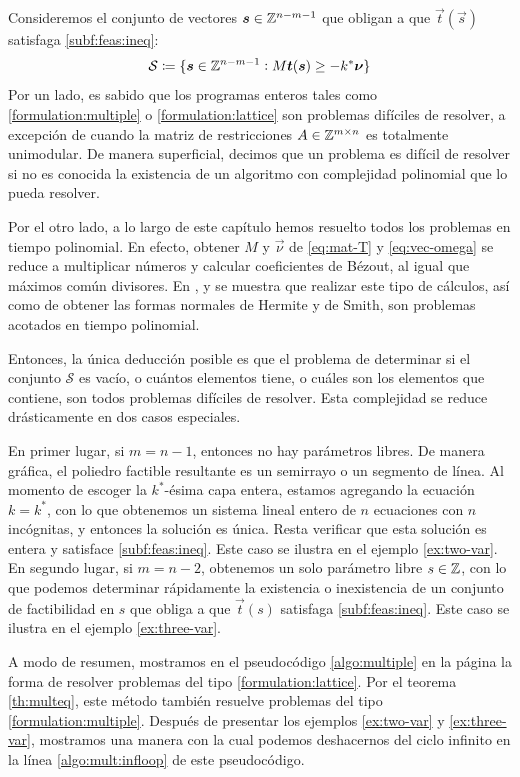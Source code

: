 Consideremos el conjunto de vectores $\boldsymbol{s} \in \mathbb{Z}^{n-m-1}$ que obligan a que $\vec{t}(\vec{s})$
satisfaga \eqref{subf:feas:ineq}:
\begin{equation*}
	\mathcal{S} \coloneq \lbrace \boldsymbol{s} \in \mathbb{Z}^{n-m-1} \vcentcolon M\boldsymbol{t}(\boldsymbol{s}) \geq -k^*\boldsymbol{\nu} \rbrace
\end{equation*}
Por un lado, es sabido que los programas enteros tales como \eqref{formulation:multiple} o
\eqref{formulation:lattice} son problemas difíciles de resolver, a excepción de cuando la matriz de
restricciones $A \in \mathbb{Z}^{m \times n}$ es totalmente unimodular. De manera superficial, decimos que
un problema es difícil de resolver si no es conocida la existencia de un algoritmo con complejidad
polinomial que lo pueda resolver.

Por el otro lado, a lo largo de este capítulo hemos resuelto todos los problemas en tiempo
polinomial. En efecto, obtener $M$ y $\vec{\nu}$ de \eqref{eq:mat-T} y \eqref{eq:vec-omega} se
reduce a multiplicar números y calcular coeficientes de Bézout, al igual que máximos común
divisores. En \cite{knuth1}, \cite{alex} y \cite{morris} se muestra que realizar este tipo de
cálculos, así como de obtener las formas normales de Hermite y de Smith, son problemas acotados en
tiempo polinomial.

Entonces, la única deducción posible es que el problema de determinar si el conjunto $\mathcal{S}$
es vacío, o cuántos elementos tiene, o cuáles son los elementos que contiene, son todos problemas
difíciles de resolver. Esta complejidad se reduce drásticamente en dos casos especiales.

En primer lugar, si $m = n - 1$, entonces no hay parámetros libres. De manera gráfica, el poliedro
factible resultante es un semirrayo o un segmento de línea. Al momento de escoger la $k^*$-ésima
capa entera, estamos agregando la ecuación $k = k^*$, con lo que obtenemos un sistema lineal entero
de $n$ ecuaciones con $n$ incógnitas, y entonces la solución es única. Resta verificar que esta
solución es entera y satisface \eqref{subf:feas:ineq}. Este caso se ilustra en el ejemplo
\ref{ex:two-var}. En segundo lugar, si $m = n - 2$, obtenemos un solo parámetro libre $s \in \mathbb{Z}$,
con lo que podemos determinar rápidamente la existencia o inexistencia de un conjunto de
factibilidad en $s$ que obliga a que $\vec{t}(s)$ satisfaga \eqref{subf:feas:ineq}. Este caso se
ilustra en el ejemplo \ref{ex:three-var}.

A modo de resumen, mostramos en el pseudocódigo \ref{algo:multiple} en la página
\pageref{algo:multiple} la forma de resolver problemas del tipo \eqref{formulation:lattice}. Por el
teorema \ref{th:multeq}, este método también resuelve problemas del tipo
\eqref{formulation:multiple}. Después de presentar los ejemplos \ref{ex:two-var} y
\ref{ex:three-var}, mostramos una manera con la cual podemos deshacernos del ciclo infinito en la
línea \ref{algo:mult:infloop} de este pseudocódigo.

